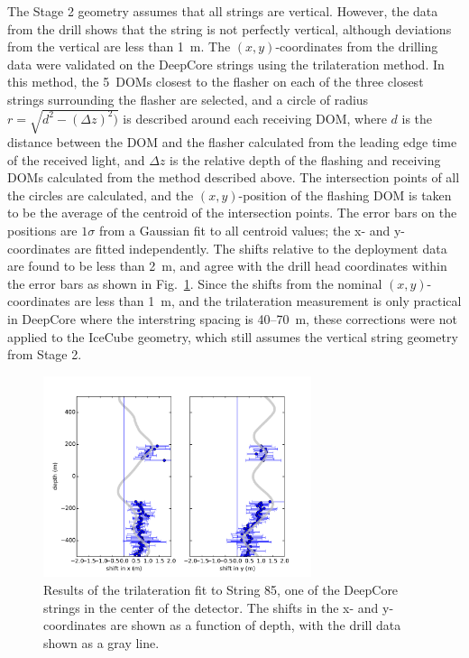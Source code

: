 The Stage 2 geometry assumes that all strings are vertical. However, the
data from the drill shows that the string is not perfectly vertical,
although deviations from the vertical are less than 1~m. The
$(x,y)$-coordinates from the drilling data were validated on the DeepCore strings
using the trilateration method. In this method, the 5~DOMs closest to the
flasher on each of the three closest strings surrounding the flasher are
selected, and a circle of radius $r = \sqrt{d^2 - (\Delta z)^2)}$ is
described around each receiving DOM, where $d$ is the distance between the DOM
and the flasher calculated from the leading edge time of the received
light, and $\Delta z$ is the relative depth of the flashing and receiving
DOMs calculated from the method described above. The intersection points of
all the circles are calculated, and the $(x,y)$-position of the flashing DOM
is taken to be the average of the centroid of the intersection points. The
error bars on the positions are $1 \sigma$ from a Gaussian fit to all
centroid values; the x- and y-coordinates are fitted independently. The
shifts relative to the deployment data are found to be less than 2~m, and
agree with the drill head coordinates within the error bars as shown in
Fig.~\ref{fig:trilateration}. Since the shifts from the nominal
$(x,y)$-coordinates are less than 1~m, and the trilateration measurement is only
practical in DeepCore where the interstring spacing is 40--70~m, these
corrections were not applied to the IceCube geometry, which still assumes
the vertical string geometry from Stage 2.

\begin{figure}[!h]
 \centering
 \includegraphics[width=0.7\textwidth]{graphics/geometry/newtrilat85.pdf}
\caption{Results of the trilateration fit to String 85, one of the DeepCore
  strings in the center of the detector. The shifts in the
  x- and y-coordinates are shown as a function of depth, with the drill data
  shown as a gray line.}
\label{fig:trilateration}
\end{figure}


